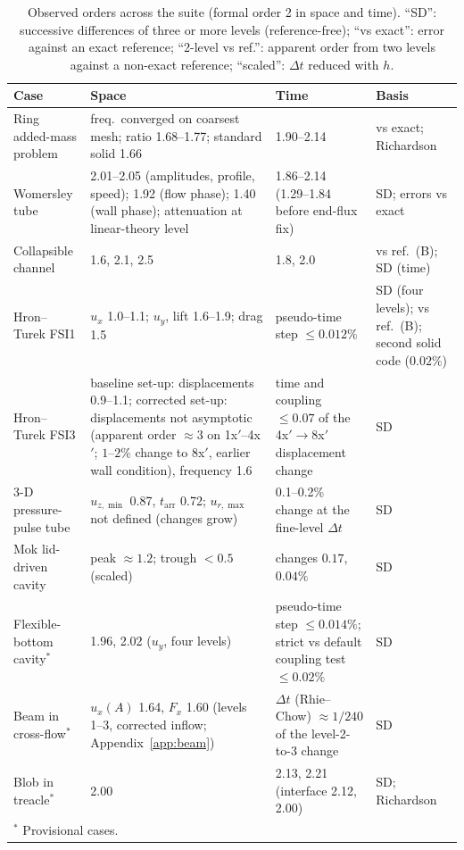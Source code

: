 \begin{table}[htbp]
	\centering
	\footnotesize
	\setlength{\tabcolsep}{3pt}
	\caption{Observed orders across the suite (formal order 2 in space and time). ``SD'': successive differences of three or more levels (reference-free); ``vs exact'': error against an exact reference; ``2-level vs ref.'': apparent order from two levels against a non-exact reference; ``scaled'': $\Delta t$ reduced with $h$.}
	\label{tab:orders}
	\begin{tabular}{p{3.0cm}p{4.6cm}p{3.4cm}p{2.8cm}}
		\toprule
		Case & Space & Time & Basis \\
		\midrule
		Ring added-mass problem & freq.\ converged on coarsest mesh; ratio 1.68--1.77; standard solid 1.66 & 1.90--2.14 & vs exact; Richardson \\
		Womersley tube & 2.01--2.05 (amplitudes, profile, speed); 1.92 (flow phase); 1.40 (wall phase); attenuation at linear-theory level & 1.86--2.14 (1.29--1.84 before end-flux fix) & SD; errors vs exact \\
		Collapsible channel & 1.6, 2.1, 2.5 & 1.8, 2.0 & vs ref.\ (B); SD (time) \\
		Hron--Turek FSI1 & $u_x$ 1.0--1.1; $u_y$, lift 1.6--1.9; drag 1.5 & pseudo-time step $\leq0.012\%$ & SD (four levels); vs ref.\ (B); second solid code ($0.02\%$) \\
		Hron--Turek FSI3 & baseline set-up: displacements 0.9--1.1; corrected set-up: displacements not asymptotic (apparent order $\approx3$ on 1x$'$--4x$'$; $1$--$2\%$ change to 8x$'$, earlier wall condition), frequency 1.6 & time and coupling $\leq0.07$ of the 4x$'\to$8x$'$ displacement change & SD \\
		3-D pressure-pulse tube & $u_{z,\min}$ 0.87, $t_\mathrm{arr}$ 0.72; $u_{r,\max}$ not defined (changes grow) & 0.1--0.2\% change at the fine-level $\Delta t$ & SD \\
		Mok lid-driven cavity & peak $\approx1.2$; trough $<0.5$ (scaled) & changes $0.17$, $0.04\%$ & SD \\
		Flexible-bottom cavity$^\ast$ & 1.96, 2.02 ($u_y$, four levels) & pseudo-time step $\leq0.014\%$; strict vs default coupling test $\leq0.02\%$ & SD \\
		Beam in cross-flow$^\ast$ & $u_x(A)$ 1.64, $F_x$ 1.60 (levels 1--3, corrected inflow; Appendix~\ref{app:beam}) & $\Delta t$ (Rhie--Chow) $\approx1/240$ of the level-2-to-3 change & SD \\
		Blob in treacle$^\ast$ & 2.00 & 2.13, 2.21 (interface 2.12, 2.00) & SD; Richardson \\
		\bottomrule
		\multicolumn{4}{l}{$^\ast$ Provisional cases.}
	\end{tabular}
\end{table}

